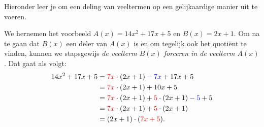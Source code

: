 \documentclass{ximera}
\begin{document}
Hieronder leer je om een deling van veeltermen op een gelijkaardige manier uit te voeren.

\begin{algorithm} 
We hernemen het voorbeeld $A(x) = 14x^2+17x+5$ en $B(x) = 2x+1$. Om na te gaan dat $B(x)$ een deler van $A(x)$ is en om tegelijk ook het quoti\"ent te vinden, kunnen we stapsgewijs {\em de veelterm $B(x)$ forceren in de veelterm $A(x)$}. Dat gaat als volgt:
\begin{align*}
14x^2 + 17x + 5 
& = \mathcolor{red}{7x} \cdot (2x+1) \mathcolor{blue}{- 7x} + 17x + 5 \\
& = \mathcolor{red}{7x} \cdot (2x+1) + 10x + 5 \\
& = \mathcolor{red}{7x} \cdot (2x+1) + \mathcolor{red}{5} \cdot (2x+1) \mathcolor{blue}{- 5} + 5 \\
& = \mathcolor{red}{7x} \cdot (2x+1) + \mathcolor{red}{5} \cdot (2x+1) \\
& = (2x+1)\cdot(\mathcolor{red}{7x + 5}).
\end{align*}




\end{algorithm}
\end{document}
